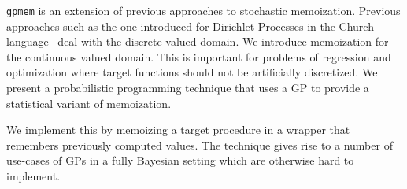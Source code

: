 {\tt gpmem} is an extension of previous approaches to stochastic memoization. Previous approaches such as the one introduced for Dirichlet Processes in the Church language~\citep{goodman2008church} deal with the discrete-valued domain. We introduce memoization for the continuous valued domain. This is important for problems of regression and optimization where target functions should not be artificially discretized. We present a probabilistic programming technique that uses a GP to provide a statistical variant of memoization. 

We implement this by memoizing a target procedure in a wrapper that remembers previously computed values. The technique gives rise to a number of use-cases of GPs in a fully Bayesian setting which are otherwise hard to implement.
